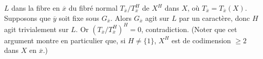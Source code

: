 \documentclass[10pt]{../fichiers-configuration-latex/smfart}
\begin{document}
$L$ dans la fibre en $\overline{x}$ du fibré normal $T_{\overline{x}}/T_{\overline{x}}^H$ de $X^H$
dans $X$, où $T_{\overline{x}} = T_{\overline{x}}(X)$. Supposons que $\overline{y}$ soit fixe sous
$G_{\overline{x}}$. Alors $G_{\overline{x}}$ agit sur $L$ par un caractère, donc $H$ agit
trivialement sur $L$. Or $(T_{\overline{x}}/T_{\overline{x}}^H)^H = 0$, contradiction. (Noter que
cet argument montre en particulier que, si $H \ne \{1\}$, $X^H$ est de codimension $\ge 2$ dans $X$
en $\overline{x}$.)


\ifx\danslelivre\undefined


\end{document}
